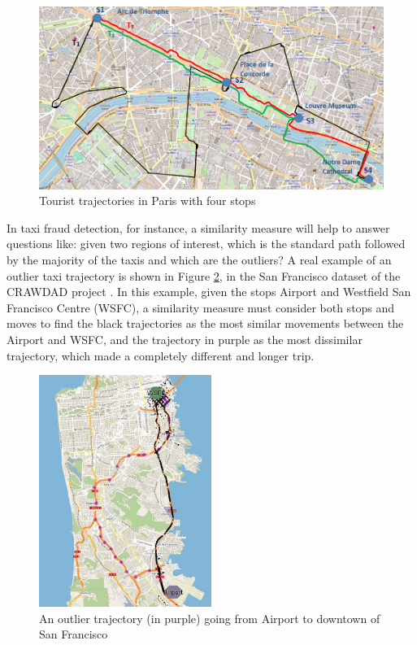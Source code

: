 \begin{figure}[h]
\centering
\includegraphics[width=1.0\textwidth]{Images/paris5.png}
\caption{Tourist trajectories in Paris with four stops}
\label{fig:Paris}
\end{figure}

In taxi fraud detection, for instance, a similarity measure will help to answer questions like: given two regions of interest, which is the standard path followed by the majority of the taxis and which are the outliers?
A real example of an outlier taxi trajectory is shown in Figure {\ref{fig:CRAWDAD_outlier}}, in the San Francisco dataset of the CRAWDAD project \cite{epfl-mobility-20090224}. In this example, given the stops Airport and  Westfield San Francisco Centre (WSFC), a similarity measure must consider both stops and moves to find the black trajectories as the most similar movements between the Airport and WSFC, and the trajectory in purple as the most dissimilar trajectory, which made a completely different and longer trip.
 
\begin{figure}[h]
\centering
\includegraphics[width=0.5\textwidth]{Images/CRAWDAD-Outlier.jpg}
\caption{\label{fig:CRAWDAD_outlier} An outlier trajectory (in purple) going from Airport to downtown of San Francisco}
\end{figure}

